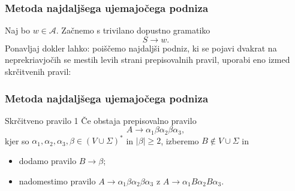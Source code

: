 \documentclass{beamer}
\theoremstyle{definition}
\providecommand{\abs}[1]{\left\lvert #1 \right\rvert}
\newcommand{\A}{\mathcal{A}}
\begin{document}
\begin{frame}
    \frametitle{Metoda najdaljšega ujemajočega podniza}
    Naj bo $w \in \A$. Začnemo s trivilano dopustno gramatiko
    \[
    S \rightarrow w.
    \]
    Ponavljaj dokler lahko: poiščemo najdaljši podniz, ki se pojavi dvakrat na neprekriavjočih 
    se mestih levih  strani prepisovalnih pravil, uporabi eno izmed skrčitvenih pravil:
\end{frame}

\begin{frame}
    \frametitle{Metoda najdaljšega ujemajočega podniza}
    \begin{block}{Skrčitveno pravilo 1}
        Če obstaja prepisovalno pravilo
        \[
            A \rightarrow \alpha_1 \beta \alpha_2 \beta \alpha_3,
        \]
        kjer so $\alpha_1, \alpha_2, \alpha_3, \beta \in (V \cup \Sigma)^*$ in $\abs{\beta} \geq 2$,
        izberemo $B \notin V \cup \Sigma$ in
        \begin{itemize}
            \item dodamo pravilo $B \rightarrow \beta$;
            \item nadomestimo pravilo $A \rightarrow \alpha_1 \beta \alpha_2 \beta \alpha_3$ z 
            $A \rightarrow \alpha_1 B \alpha_2 B \alpha_3$.
        \end{itemize}
    \end{block}
\end{frame}
\end{document}
